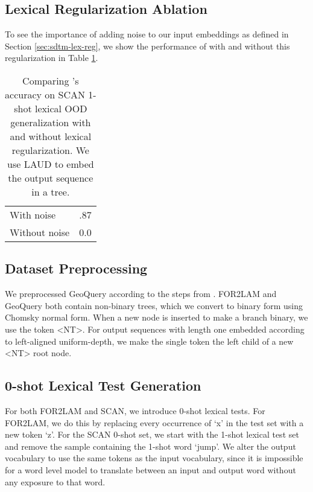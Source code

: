 \subsection{Lexical Regularization Ablation} \label{sec:sdtm-lex-reg-ablation}
To see the importance of adding noise to our input embeddings as defined in Section \ref{sec:sdtm-lex-reg}, we show the performance of \sdtm with and without this regularization in Table \ref{tab:lex-reg-ablation}. 

\begin{table}
  \caption{Comparing \sdtm's accuracy on SCAN 1-shot lexical OOD generalization with and without lexical regularization. We use LAUD to embed the output sequence in a tree.}
  \label{tab:lex-reg-ablation}
  \centering
  \begin{tabular}{ll}
    \toprule
    With noise     & .87 \\
    Without noise & 0.0 \\
    \bottomrule
\end{tabular}
\end{table}




\subsection{Dataset Preprocessing} \label{sec:sdtm-data-preprocessing}
We preprocessed GeoQuery according to the steps from \citet{shaw-etal-2021-compositional}. FOR2LAM and GeoQuery both contain non-binary trees, which we convert to binary form using Chomsky normal form. When a new node is inserted to make a branch binary, we use the token <NT>. For output sequences with length one embedded according to left-aligned uniform-depth, we make the single token the left child of a new <NT> root node.

\subsection{0-shot Lexical Test Generation}
For both FOR2LAM and SCAN, we introduce 0-shot lexical tests. For FOR2LAM, we do this by replacing every occurrence of `x' in the test set with a new token `z'. For the SCAN 0-shot set, we start with the 1-shot lexical test set and remove the sample containing the 1-shot word `jump'. We alter the output vocabulary to use the same tokens as the input vocabulary, since it is impossible for a word level model to translate between an input and output word without any exposure to that word.

